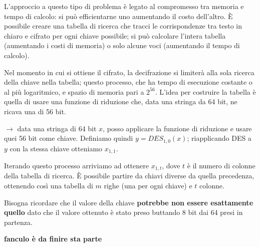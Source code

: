 \noindent L'approccio a questo tipo di problema è legato al compromesso tra memoria e tempo di calcolo: si può efficientarne uno aumentando 
il costo dell'altro. È possibile creare una tabella di ricerca che tracci le corrispondenze tra testo in chiaro e cifrato per ogni chiave possibile; 
si può calcolare l'intera tabella (aumentando i costi di memoria) o solo alcune voci (aumentando il tempo di calcolo).

\noindent Nel momento in cui si ottiene il cifrato, la decifrazione si limiterà alla sola ricerca della chiave nella tabella; questo processo, che ha 
tempo di esecuzione costante o al più logaritmico, e spazio di memoria pari a $2^56$. L'idea per costruire
la tabella è quella di usare una funzione di riduzione che, data una stringa da 64 bit, ne ricava una di 56 bit. 

\noindent $\rightarrow$ data una stringa di 64 bit $x$, posso applicare la funzione di riduzione e usare quei 56 bit come chiave. Definiamo quindi 
$y = DES_{1,0}(x)$; riapplicando DES a $y$ con la stessa chiave otteniamo $x_{1,1}$.

\noindent Iterando questo processo arriviamo ad ottenere $x_{1,t}$, dove $t$ è il numero di colonne della tabella di ricerca. È possibile partire 
da chiavi diverse da quella precedenza, ottenendo così una tabella di $m$ righe (una per ogni chiave) e $t$ colonne.

\noindent Bisogna ricordare che il valore della chiave \textbf{potrebbe non essere esattamente quello} dato che il valore ottenuto è stato preso buttando 
8 bit dai 64 presi in partenza.


\textbf{fanculo è da finire sta parte}








